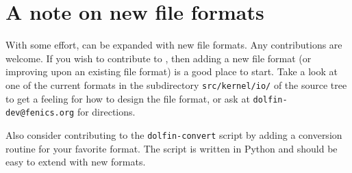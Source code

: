 \section{A note on new file formats}

With some effort, \dolfin{} can be expanded with new file formats. Any
contributions are welcome. If you wish to contribute to \dolfin{},
then adding a new file format (or improving upon an existing file
format) is a good place to start. Take a look at one of the current
formats in the subdirectory \texttt{src/kernel/io/} of the \dolfin{}
source tree to get a feeling for how to design the file format, or ask
at \texttt{dolfin-dev@fenics.org} for directions.

Also consider contributing to the \texttt{dolfin-convert} script by
adding a conversion routine for your favorite format. The script is
written in Python and should be easy to extend with new formats.
